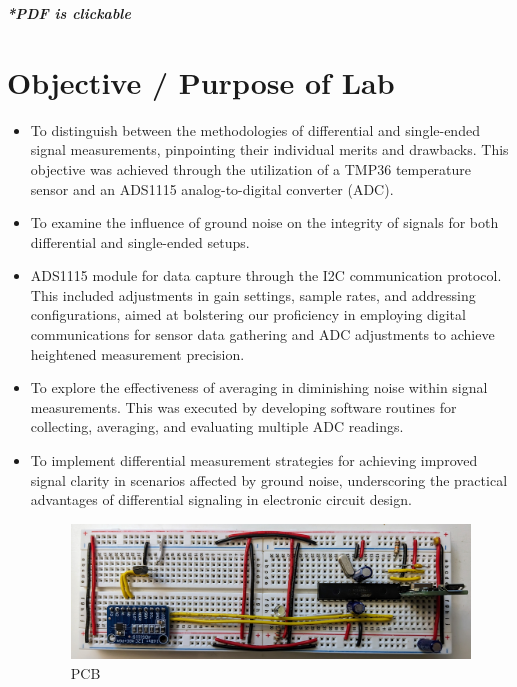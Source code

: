 \documentclass[a4paper,11pt]{article}%
\begin{document}


\pagebreak

\tableofcontents
\listoffigures
\listoftables
\vfill
\begin{center}
	\textbf{\textit{*PDF is clickable}}
\end{center}

\pagebreak

\section{Objective / Purpose of Lab}

\begin{itemize}
	\item To distinguish between the methodologies of differential and single-ended signal measurements, pinpointing their individual merits and drawbacks. This objective was achieved through the utilization of a TMP36 temperature sensor and an ADS1115 analog-to-digital converter (ADC).

	\item To examine the influence of ground noise on the integrity of signals for both differential and single-ended setups.
	
	\item ADS1115 module for data capture through the I2C communication protocol. This included adjustments in gain settings, sample rates, and addressing configurations, aimed at bolstering our proficiency in employing digital communications for sensor data gathering and ADC adjustments to achieve heightened measurement precision.
	
	\item To explore the effectiveness of averaging in diminishing noise within signal measurements. This was executed by developing software routines for collecting, averaging, and evaluating multiple ADC readings.

	
	\item To implement differential measurement strategies for achieving improved signal clarity in scenarios affected by ground noise, underscoring the practical advantages of differential signaling in electronic circuit design.\\
	
	
	\begin{figure}[!h]
		\centering
		\includegraphics[scale=0.12]{figures/breadboard.jpg}
		\caption{PCB}

	\end{figure}
	
\end{itemize}
\end{document}
